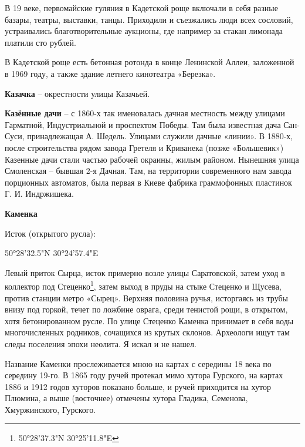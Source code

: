 
В 19 веке, первомайские гуляния в Кадетской роще включали в себя разные базары, театры, выставки, танцы. Приходили и съезжались люди всех сословий, устраивались благотворительные аукционы, где например за стакан лимонада платили сто рублей.

В Кадетской роще есть бетонная ротонда в конце Ленинской Аллеи, заложенной в 1969 году, а также здание летнего кинотеатра «Березка».\\

\medskip

\textbf{Казачка} – окрестности улицы Казачьей.\\

\medskip

\textbf{Казённые дачи} – с 1860-х так именовалась дачная местность между улицами Гарматной, Индустриальной и проспектом Победы. Там была известная дача Сан-Суси, принадлежащая А. Шедель. Улицами служили дачные «линии». В 1880-х, после строительства рядом завода Гретеля и Криванека (позже «Большевик») Казенные дачи стали частью рабочей окраины, жилым районом. Нынешняя улица Смоленская – бывшая 2-я Дачная. Там, на территории современного нам завода порционных автоматов, была первая в Киеве фабрика граммофонных пластинок Г. И. Индржишека.\\

\medskip

\textbf{Каменка}

Исток (открытого русла): 

50°28'32.5"N 30°24'57.4"E

Левый приток Сырца, исток примерно возле улицы Саратовской, затем уход в коллектор под Стеценко\footnote{50°28'37.3"N 30°25'11.8"E}, затем выход в пруды на стыке Стеценко и Щусева, против станции метро «Сырец». Верхняя половина ручья, исторгаясь из трубы внизу под горкой, течет по ложбине оврага, среди тенистой рощи, в открытом, хотя бетонированном русле. По улице Стеценко Каменка принимает в себя воды многочисленных родников, сочащихся из крутых склонов. Археологи ищут там следы поселения эпохи неолита. Я искал и не нашел.

Название Каменки прослеживается мною на картах с середины 18 века по середину 19-го. В 1865 году ручей протекал мимо хутора Гурского, на картах 1886 и 1912 годов хуторов показано больше, и ручей приходится на хутор Плюмина, а выше (восточнее) отмечены хутора Гладика, Семенова, Хмуржинского, Гурского. 


